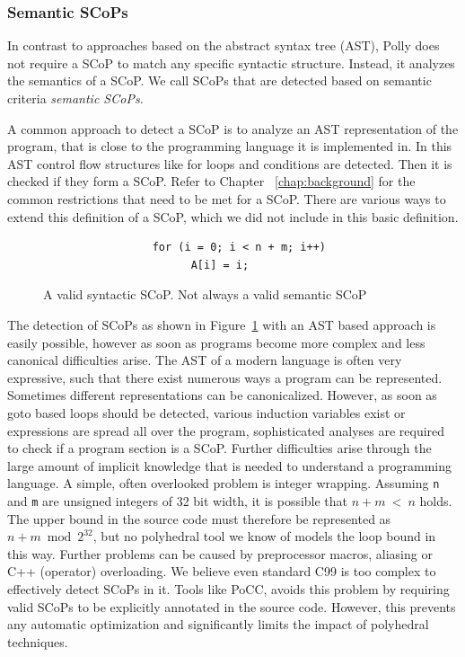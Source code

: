 \subsubsection{Semantic SCoPs}

In contrast to approaches based on the abstract syntax
tree (AST), Polly does not require a SCoP to match any specific syntactic
structure. Instead, it analyzes the semantics of a SCoP. We call SCoPs
that are detected based on semantic criteria \emph{semantic SCoPs}.

A common approach to detect a SCoP is to analyze an AST representation of
the program, that is close to the programming language it is implemented in. In
this AST control flow structures like for loops and conditions are
detected. Then it is checked if they form a SCoP. Refer to Chapter ~\ref{chap:background} for the common restrictions that need
to be met for a SCoP. There are various ways to
extend this definition of a SCoP, which we did not include in this basic
definition.

\begin{figure}

\begin{lstlisting}
                 for (i = 0; i < n + m; i++)
                       A[i] = i;
\end{lstlisting}
	\caption{A valid syntactic SCoP. Not always a valid semantic SCoP}
	\label{fig:syntacticScop}
\end{figure}

The detection of SCoPs as shown in Figure~\ref{fig:syntacticScop} with an AST
based approach is easily possible, however as soon as programs become more
complex and less canonical difficulties arise. The AST of a modern language is
often very expressive, such that there exist numerous ways a program can be
represented.  Sometimes different representations can be canonicalized.
However, as soon as goto based loops should be detected, various induction
variables exist or expressions are spread all over the program, sophisticated
analyses are required to check if a program section is a SCoP. Further
difficulties arise through the large amount of implicit knowledge that is
needed to understand a programming language.  A simple, often overlooked problem is integer
wrapping.  Assuming \texttt{n} and \texttt{m} are unsigned integers of 32 bit
width, it is possible that $n+m$~<~$n$ holds. The upper bound in the source code must
therefore be represented as $n+m\bmod 2^{32}$, but no polyhedral tool we know
of models the loop bound in this way. Further problems can be caused by
preprocessor macros, aliasing or C++ (operator) overloading. We believe even
standard C99 is too complex to effectively detect SCoPs in it. Tools like PoCC,
avoids this problem by requiring valid SCoPs to be explicitly annotated in the
source code. However, this prevents any automatic optimization and
significantly limits the impact of polyhedral techniques.

